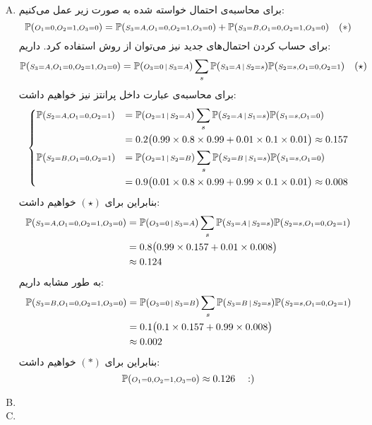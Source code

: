 \documentclass[a4paper, 12pt]{article}
\begin{document}
\begin{enumerate}[A)]
	\item
	برای محاسبه‌ی احتمال خواسته شده به صورت زیر عمل می‌کنیم:
	\[
	{\mathbb P}({\scriptstyle O_1=0, O_2=1, O_3=0}) = {\mathbb P}({\scriptstyle S_3=A, O_1=0, O_2=1, O_3=0}) + {\mathbb P}({\scriptstyle S_3=B, O_1=0, O_2=1, O_3=0}) \quad (\ast)
	\]
	برای حساب کردن احتمال‌های جدید نیز می‌توان از روش  استفاده کرد. داریم:
	\[
	{\mathbb P}({\scriptstyle S_3=A, O_1=0, O_2=1, O_3=0}) = {\mathbb P}({\scriptstyle O_3=0\,|\,S_3=A})\sum_{s}{\mathbb P}({\scriptstyle S_3=A\,|\,S_2=s}){\mathbb P}({\scriptstyle S_2=s, O_1=0, O_2=1}) \quad (\star)
	\]
	برای محاسبه‌ی عبارت داخل پرانتز نیز خواهیم داشت:
	\[
	\begin{dcases}
		{\mathbb P}({\scriptstyle S_2=A, O_1=0, O_2=1}) &= {\mathbb P}({\scriptstyle O_2=1\,|\,S_2=A})\sum_s{\mathbb P}({\scriptstyle S_2=A\,|\,S_1=s}){\mathbb P}({\scriptstyle S_1=s, O_1=0}) \\&= 0.2\big(0.99\times0.8\times0.99 + 0.01\times0.1\times0.01\big) \approx 0.157\\
		{\mathbb P}({\scriptstyle S_2=B, O_1=0, O_2=1}) &= {\mathbb P}({\scriptstyle O_2=1\,|\,S_2=B})\sum_s{\mathbb P}({\scriptstyle S_2=B\,|\,S_1=s}){\mathbb P}({\scriptstyle S_1=s, O_1=0}) \\&= 0.9\big(0.01\times0.8\times0.99+0.99\times0.1\times0.01\big) \approx  0.008\\
	\end{dcases}
	\]
	بنابراین برای $(\star)$ خواهیم داشت:
	\[
	\begin{aligned}
		{\mathbb P}({\scriptstyle S_3=A, O_1=0, O_2=1, O_3=0}) &= {\mathbb P}({\scriptstyle O_3=0\,|\,S_3=A})\sum_{s}{\mathbb P}({\scriptstyle S_3=A\,|\,S_2=s}){\mathbb P}({\scriptstyle S_2=s, O_1=0, O_2=1}) \\
		&= 0.8\big(0.99\times0.157 + 0.01\times 0.008\big) \\
		&\approx 0.124
	\end{aligned}
	\]
	به طور مشابه داریم:
	\[
	\begin{aligned}
		{\mathbb P}({\scriptstyle S_3=B, O_1=0, O_2=1, O_3=0}) &= {\mathbb P}({\scriptstyle O_3=0\,|\,S_3=B})\sum_{s}{\mathbb P}({\scriptstyle S_3=B\,|\,S_2=s}){\mathbb P}({\scriptstyle S_2=s, O_1=0, O_2=1}) \\
		&=0.1\big(0.1\times0.157 + 0.99\times0.008\big) \\
		&\approx 0.002
	\end{aligned}
	\]
	بنابراین برای $(\ast)$ خواهیم داشت:
	\[
	{\mathbb P}({\scriptstyle O_1=0, O_2=1, O_3=0}) \approx 0.126\quad :)
	\]
	\item
	
	\item
\end{enumerate}
\end{document}
